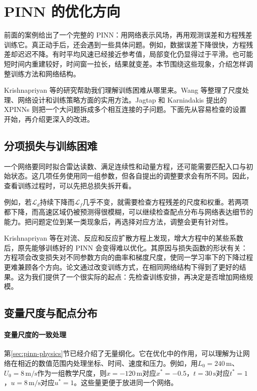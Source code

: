 \FloatBarrier
\section{PINN 的优化方向}
\label{sec:pinn-optimization}
前面的案例给出了一个完整的 PINN：用网络表示风场，再用观测误差和方程残差训练它。真正动手后，还会遇到一些具体问题。例如，数据误差下降很快，方程残差却迟迟不降。有时平均风速已经接近参考值，局部变化仍显得过于平滑。也可能短时间内重建较好，时间窗一拉长，结果就变差。本节围绕这些现象，介绍怎样调整训练方法和网络结构。

Krishnapriyan 等的研究帮助我们理解训练困难从哪里来\cite{krishnapriyan2021failure}。Wang 等整理了尺度处理、网络设计和训练策略方面的实用方法\cite{wang2023expert}。Jagtap 和 Karniadakis 提出的 XPINNs 则把一个大问题拆成多个相互连接的子问题\cite{jagtap2020xpinn}。下面先从容易检查的设置开始，再介绍更深入的改进。

\subsection{分项损失与训练困难}
一个网络要同时拟合雷达读数、满足连续性和动量方程，还可能需要匹配入口与初始状态。这几项任务使用同一组参数，但各自提出的调整要求会有所不同。因此，查看训练过程时，可以先把总损失拆开看。

例如，若$\mathcal L_d$持续下降而$\mathcal L_f$几乎不变，就需要检查方程残差的尺度和权重。若两项都下降，而高速区域仍被预测得很模糊，可以继续检查配点分布与网络表达细节的能力。把问题定位到某一类现象后，再选择对应方法，调整会更有针对性。

Krishnapriyan 等在对流、反应和反应扩散方程上发现，增大方程中的某些系数后，原先能够训练好的 PINN 会变得难以优化。其原因与损失函数的形状有关：方程项会改变损失对不同参数方向的曲率和梯度尺度，使同一学习率下的下降过程更难兼顾各个方向。论文通过改变训练方式，在相同网络结构下得到了更好的结果\cite{krishnapriyan2021failure}。这为我们提供了一个很实际的起点：先检查训练安排，再决定是否增加网络规模。

\subsection{变量尺度与配点分布}
\paragraph{变量尺度的一致处理}
第\ref{sec:pinn-physics}节已经介绍了无量纲化。它在优化中的作用，可以理解为让网络在相近的数值范围内处理坐标、时间、速度和压力。例如，用$L_0=240\,\mathrm{m}$、$U_0=8\,\mathrm{m/s}$作为一组教学尺度，则$x=-120\,\mathrm{m}$对应$x^*=-0.5$，$t=30\,\mathrm{s}$对应$t^*=1$，$u=8\,\mathrm{m/s}$对应$u^*=1$。这些量更便于放进同一个网络。

